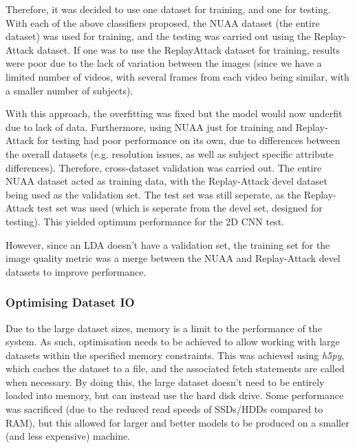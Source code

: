 \documentclass[10pt,a4paper]{article}
\begin{document}
            Therefore, it was decided to use one dataset for training, and one for testing.
            With each of the above classifiers proposed, the NUAA dataset (the entire dataset) was used for training, and the testing was carried out using the Replay-Attack dataset.
            If one was to use the ReplayAttack dataset for training, results were poor due to the lack of variation between the images (since we have a limited number of videos, with several frames from each video being similar, with a smaller number of subjects).
            
            With this approach, the overfitting was fixed but the model would now underfit due to lack of data. Furthermore, using NUAA just for training and Replay-Attack for testing had poor performance on its own, due to differences between the overall datasets (e.g. resolution issues, as well as subject specific attribute differences).
            Therefore, cross-dataset validation was carried out. The entire NUAA dataset acted as training data, with the Replay-Attack devel dataset being used as the validation set. The test set was still seperate, as the Replay-Attack test set was used (which is seperate from the devel set, designed for testing).
            This yielded optimum performance for the 2D CNN test.

            However, since an LDA doesn't have a validation set, the training set for the image quality metric was a merge between the NUAA and Replay-Attack devel datasets to improve performance.

        \subsubsection{Optimising Dataset IO}
            Due to the large dataset sizes, memory is a limit to the performance of the system. As such, optimisation needs to be achieved to allow working with large datasets within the specified memory constraints.
            This was achieved using \emph{h5py}, which caches the dataset to a file, and the associated fetch statements are called when necessary. By doing this, the large dataset doesn't need to be entirely loaded into memory,
            but can instead use the hard disk drive. Some performance was sacrificed (due to the reduced read speeds of SSDs/HDDs compared to RAM), but this allowed for larger and better models to be produced on a smaller (and less expensive) machine. 
       
\end{document}
